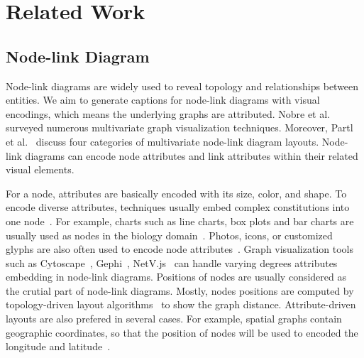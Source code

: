 \section{Related Work}\label{sec:relatedwork}
\subsection{Node-link Diagram}
Node-link diagrams are widely used to reveal topology and relationships between entities.
We aim to generate captions for node-link diagrams with visual encodings, which means the underlying graphs are attributed.
Nobre et al.~\cite{DBLP:journals/cgf/NobreMSL19} surveyed numerous multivariate graph visualization techniques.
Moreover, Partl et al.~\cite{DBLP:conf/biovis/PartlKLKSS12} discuss four categories of multivariate node-link diagram layouts.
Node-link diagrams can encode node attributes and link attributes within their related visual elements.

For a node, attributes are basically encoded with its size, color, and shape.
To encode diverse attributes, techniques usually embed complex constitutions into one node~\cite{DBLP:conf/infovis/AuberCJM03}.
For example, charts such as line charts, box plots and bar charts are usually used as nodes in the biology domain~\cite{gehlenborg2010visualization, DBLP:conf/iv/JusufiDK10}.
Photos, icons, or customized glyphs are also often used to encode node attributes~\cite{DBLP:conf/chi/DunneS13}.
Graph visualization tools such as Cytoscape~\cite{DBLP:journals/bioinformatics/FranzLHDSB16}, Gephi~\cite{DBLP:conf/icwsm/BastianHJ09}, NetV.js~\cite{HAN2021} can handle varying degrees attributes embedding in node-link diagrams.
Positions of nodes are usually considered as the crutial part of node-link diagrams.
Mostly, nodes positions are computed by topology-driven layout algorithms~\cite{DBLP:journals/spe/FruchtermanR91, DBLP:journals/cgf/KruigerRMKKT17, DBLP:journals/tvcg/GansnerHN13, DBLP:journals/tvcg/ZhuCHHLZ21} to show the graph distance.
Attribute-driven layouts are also prefered in several cases.
For example, spatial graphs contain geographic coordinates, so that the position of nodes will be used to encoded the longitude and latitude~\cite{DBLP:journals/tvcg/ElzenW14, DBLP:journals/tvcg/Guo09}.

